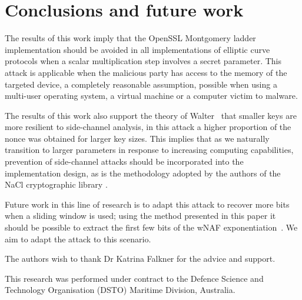 \documentclass[twocolumn]{svjour3}
\newcommand{\starpar}[1]{\par{\footnotesize $\star$ \hl{#1}\par}}
\begin{document}
\section{Conclusions and future work}
The results of this work imply that the OpenSSL Montgomery ladder implementation should be avoided in 
all implementations of elliptic curve protocols when a scalar multiplication step involves a secret parameter. 
This attack is applicable when the malicious party has access to the memory of the targeted device, 
a completely reasonable assumption, possible when using a multi-user operating system, a virtual machine or a computer victim to malware. 

The results of this work also support the theory of Walter~\cite{walter04longer} that smaller keys are more resilient to side-channel analysis, in this attack a higher proportion of the nonce was obtained for larger key sizes. This implies that as we naturally transition to larger parameters in response to increasing computing capabilities, prevention of side-channel attacks should be incorporated into the implementation design, as is the methodology adopted by the authors of the NaCl cryptographic library \cite{dan-tan-peter}. 

Future work in this line of research is to adapt this attack to recover more bits when a sliding window is used; 
using the method presented in this paper it should be possible  to extract the first few bits of the wNAF exponentiation~\cite{moller03improved}.
We aim to adapt the attack to this scenario.



\begin{acknowledgements}
The authors wish to thank Dr Katrina Falkner for the advice and support.

This research was performed under contract to the Defence
Science and Technology Organisation (DSTO) Maritime Division,
Australia.
\end{acknowledgements}




\end{document}
